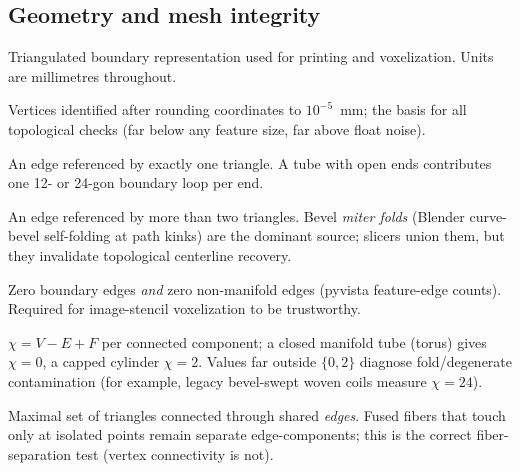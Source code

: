 \documentclass[11pt]{article}
\begin{document}
\subsection{Geometry and mesh integrity}
\begin{description}[style=nextline,itemsep=0.35em]
  \item[STL] Triangulated boundary representation used for printing and voxelization.
    Units are millimetres throughout.
  \item[Welded vertex set] Vertices identified after rounding coordinates to $10^{-5}$~mm;
    the basis for all topological checks (far below any feature size, far above float noise).
  \item[Boundary (open) edge] An edge referenced by exactly one triangle. A tube with
    open ends contributes one 12- or 24-gon boundary loop per end.
  \item[Non-manifold edge] An edge referenced by more than two triangles. Bevel
    \emph{miter folds} (Blender curve-bevel self-folding at path kinks) are the dominant source;
    slicers union them, but they invalidate topological centerline recovery.
  \item[Watertight] Zero boundary edges \emph{and} zero non-manifold edges
    (pyvista feature-edge counts). Required for image-stencil voxelization to be trustworthy.
  \item[Euler characteristic $\chi$] $\chi = V - E + F$ per connected component; a closed
    manifold tube (torus) gives $\chi=0$, a capped cylinder $\chi=2$. Values far outside
    $\{0,2\}$ diagnose fold/degenerate contamination (for example, legacy bevel-swept woven coils measure $\chi=24$).
  \item[Edge-connected component] Maximal set of triangles connected through shared
    \emph{edges}. Fused fibers that touch only at isolated points remain separate
    edge-components; this is the correct fiber-separation test (vertex connectivity is not).
\end{description}
\end{document}
